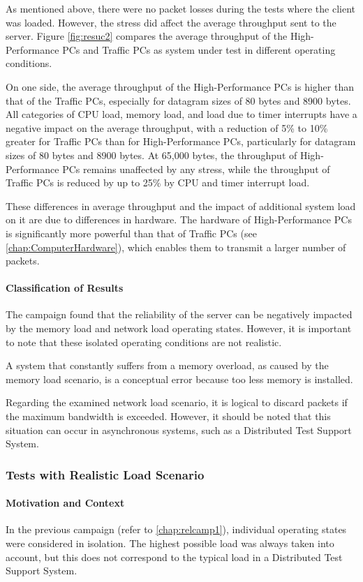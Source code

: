 As mentioned above, there were no packet losses during the tests where the client was loaded. However, the stress did affect the average throughput sent to the server. Figure \ref{fig:resuc2} compares the average throughput of the High-Performance PCs and Traffic PCs as system under test in different operating conditions.

On one side, the average throughput of the High-Performance PCs is higher than that of the Traffic PCs, especially for datagram sizes of 80 bytes and 8900 bytes. All categories of CPU load, memory load, and load due to timer interrupts have a negative impact on the average throughput, with a reduction of 5\% to 10\% greater for Traffic PCs than for High-Performance PCs, particularly for datagram sizes of 80 bytes and 8900 bytes.  At 65,000 bytes, the throughput of High-Performance PCs remains unaffected by any stress, while the throughput of Traffic PCs is reduced by up to 25\% by CPU and timer interrupt load.

These differences in average throughput and the impact of additional system load on it are due to differences in hardware. The hardware of High-Performance PCs is significantly more powerful than that of Traffic PCs (see \ref{chap:ComputerHardware}), which enables them to transmit a larger number of packets.

\paragraph{Classification of Results}
The campaign found that the reliability of the server can be negatively impacted by the memory load and network load operating states. However, it is important to note that these isolated operating conditions are not realistic.

A system that constantly suffers from a memory overload, as caused by the memory load scenario, is a conceptual error because too less memory is installed.

Regarding the examined network load scenario, it is logical to discard packets if the maximum bandwidth is exceeded. However, it should be noted that this situation can occur in asynchronous systems, such as a Distributed Test Support System.

\subsubsection{Tests with Realistic Load Scenario} \label{chap:campaignloadscen}
\paragraph{Motivation and Context}
In the previous campaign (refer to \ref{chap:relcamp1}), individual operating states were considered in isolation. The highest possible load was always taken into account, but this does not correspond to the typical load in a Distributed Test Support System.

